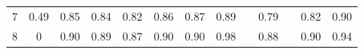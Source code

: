 \documentclass[twoside,11pt]{article}
\begin{document}
\begin{table}[H]
{\begin{tabular}{cccccccclclcc}
\multicolumn{1}{|c|}{7}                                                                           & \multicolumn{1}{c|}{0.49}                                                           & \multicolumn{1}{c|}{0.85}                                                                      & \multicolumn{1}{c|}{0.84}                                                                & \multicolumn{1}{c|}{0.82}                                                                & \multicolumn{1}{c|}{0.86}                                                                & \multicolumn{1}{c|}{\cellcolor[HTML]{ECF4FF}0.87}                                           & \multicolumn{1}{c|}{\cellcolor[HTML]{FFCCC9}0.89}                                           & \multicolumn{1}{l|}{}                                                                          & \multicolumn{1}{c|}{0.79}                                                                   & \multicolumn{1}{l|}{}                    & \multicolumn{1}{c|}{0.82}                                                                      & \multicolumn{1}{c|}{0.90}                                                                      \\ \cline{1-1}
\multicolumn{1}{|c|}{8}                                                                           & \multicolumn{1}{c|}{0}                                                              & \multicolumn{1}{c|}{\cellcolor[HTML]{ECF4FF}0.90}                                              & \multicolumn{1}{c|}{0.89}                                                                & \multicolumn{1}{c|}{0.87}                                                                & \multicolumn{1}{c|}{\cellcolor[HTML]{ECF4FF}0.90}                                        & \multicolumn{1}{c|}{\cellcolor[HTML]{ECF4FF}0.90}                                           & \multicolumn{1}{c|}{\cellcolor[HTML]{FFCCC9}0.98}                                           & \multicolumn{1}{l|}{}                                                                          & \multicolumn{1}{c|}{0.88}                                                                   & \multicolumn{1}{l|}{}                    & \multicolumn{1}{c|}{0.90}                                                                      & \multicolumn{1}{c|}{0.94}                                                                      \\ \cline{1-1}

\end{tabular}}
\end{table}
\end{document}

